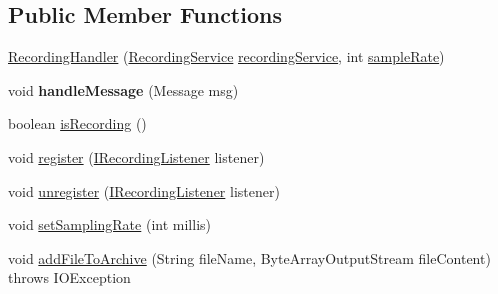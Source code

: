 \subsection*{Public Member Functions}
\begin{DoxyCompactItemize}
\item 
\hyperlink{classcom_1_1qualoutdoor_1_1recorder_1_1recording_1_1RecordingHandler_add2509ab7001e794162e4de5a107fed9}{Recording\-Handler} (\hyperlink{classcom_1_1qualoutdoor_1_1recorder_1_1recording_1_1RecordingService}{Recording\-Service} \hyperlink{classcom_1_1qualoutdoor_1_1recorder_1_1recording_1_1RecordingHandler_a0fd9f14da8697f982103fdde7a6478f6}{recording\-Service}, int \hyperlink{classcom_1_1qualoutdoor_1_1recorder_1_1recording_1_1RecordingHandler_ada90cb2be34fabadd3ba906554dff109}{sample\-Rate})
\item 
\hypertarget{classcom_1_1qualoutdoor_1_1recorder_1_1recording_1_1RecordingHandler_a0ac0fdb3e164d2dbc5b41a09170f282b}{void {\bfseries handle\-Message} (Message msg)}\label{classcom_1_1qualoutdoor_1_1recorder_1_1recording_1_1RecordingHandler_a0ac0fdb3e164d2dbc5b41a09170f282b}

\item 
boolean \hyperlink{classcom_1_1qualoutdoor_1_1recorder_1_1recording_1_1RecordingHandler_a051a29205ac122d1a6d82d8d8ef1cfdf}{is\-Recording} ()
\item 
void \hyperlink{classcom_1_1qualoutdoor_1_1recorder_1_1recording_1_1RecordingHandler_a222cb883b380d34f1a821580c977b570}{register} (\hyperlink{interfacecom_1_1qualoutdoor_1_1recorder_1_1recording_1_1IRecordingListener}{I\-Recording\-Listener} listener)
\item 
void \hyperlink{classcom_1_1qualoutdoor_1_1recorder_1_1recording_1_1RecordingHandler_a3f5fe7d70d8e3ee3f1d75568a74298bd}{unregister} (\hyperlink{interfacecom_1_1qualoutdoor_1_1recorder_1_1recording_1_1IRecordingListener}{I\-Recording\-Listener} listener)
\item 
void \hyperlink{classcom_1_1qualoutdoor_1_1recorder_1_1recording_1_1RecordingHandler_aec4df0bb64c8b5998819bcdb651b6530}{set\-Sampling\-Rate} (int millis)
\item 
void \hyperlink{classcom_1_1qualoutdoor_1_1recorder_1_1recording_1_1RecordingHandler_a606dcce90bb96f99f391ea37d3e9b332}{add\-File\-To\-Archive} (String file\-Name, Byte\-Array\-Output\-Stream file\-Content)  throws I\-O\-Exception 
\end{DoxyCompactItemize}
